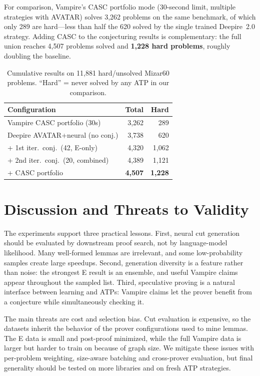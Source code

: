 \documentclass{easychair}
\newcommand{\Eprover}{E\xspace}
\newcommand{\Vampire}{Vampire\xspace}
\begin{document}
For comparison, \Vampire's CASC portfolio mode (30-second limit,
multiple strategies with AVATAR) solves 3,262 problems on the same
benchmark, of which only 289 are hard---less than half the 620
solved by the single trained Deepire~2.0 strategy.  Adding CASC to the
conjecturing results is complementary: the full union reaches
4,507 problems solved and \textbf{1,228 hard problems}, roughly
doubling the baseline.

\begin{table}[t]
\centering
\caption{Cumulative results on 11,881 hard/unsolved Mizar60 problems.
  ``Hard'' = never solved by any ATP in our comparison.}
\label{tab:iter2}
\small
\begin{tabular}{lrr}
\toprule
Configuration & Total & Hard \\
\midrule
\Vampire CASC portfolio (30s)          & 3,262 & 289 \\
Deepire AVATAR+neural (no conj.)      & 3,738 & 620 \\
\midrule
+ 1st iter.\ conj.\ (42, E-only)      & 4,320 & 1,062 \\
+ 2nd iter.\ conj.\ (20, combined)     & 4,389 & 1,121 \\
+ CASC portfolio                        & \textbf{4,507} & \textbf{1,228} \\
\bottomrule
\end{tabular}
\end{table}

\section{Discussion and Threats to Validity}
\label{sec:discussion}

The experiments support three practical lessons.  First, neural cut
generation should be evaluated by downstream proof search, not by
language-model likelihood.  Many well-formed lemmas are irrelevant, and
some low-probability samples create large speedups.  Second,
generation diversity is a feature rather than noise: the strongest
\Eprover result is an ensemble, and useful \Vampire claims appear
throughout the sampled list.  Third, speculative proving is a natural
interface between learning and ATPs: \Vampire claims let the prover
benefit from a conjecture while simultaneously checking it.

The main threats are cost and selection bias.  Cut evaluation is
expensive, so the datasets inherit the behavior of the prover
configurations used to mine lemmas.  The \Eprover data is small and
post-proof minimized, while the full \Vampire data is larger but harder
to train on because of graph size.  We mitigate these issues with
per-problem weighting, size-aware batching and cross-prover evaluation,
but final generality should be tested on more libraries and on fresh
ATP strategies.
\end{document}
